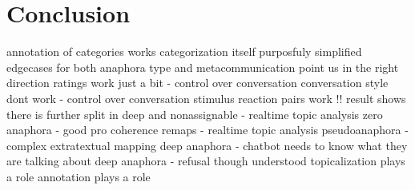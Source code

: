 \section{Conclusion}

annotation of categories works
categorization itself purposfuly simplified
edgecases for both anaphora type and metacommunication point us in the right direction
ratings work just a bit - control over conversation
conversation style dont work - control over conversation
stimulus reaction pairs work !!
    result shows there is further split in deep and nonassignable - realtime topic analysis
zero anaphora - good
pro coherence
remaps - realtime topic analysis
pseudoanaphora - complex extratextual mapping
deep anaphora - chatbot needs to know what they are talking about
deep anaphora - refusal though understood
    topicalization plays a role
    annotation plays a role
